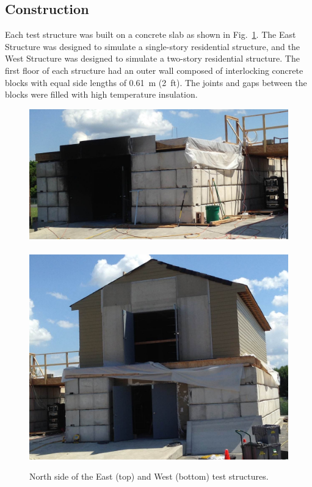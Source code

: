 \documentclass[12pt,oneside]{book}
\begin{document}
\subsection{Construction}
\label{sec:construction}
Each test structure was built on a concrete slab as shown in Fig.~\ref{fig:struct_pics}. The East Structure was designed to simulate a single-story residential structure, and the West Structure was designed to simulate a two-story residential structure. The first floor of each structure had an outer wall composed of interlocking concrete blocks with equal side lengths of 0.61~m (2~ft). The joints and gaps between the blocks were filled with high temperature insulation.

\begin{figure}[!ht]
	\includegraphics[width=5.25in]{../../Hose_Stream_Tests/Figures/Pictures/east_structure}
	\\~\\
	\includegraphics[width=5.25in]{../../Hose_Stream_Tests/Figures/Pictures/west_structure}
	\caption[North side of the East and West Structures.]{North side of the East (top) and West (bottom) test structures.}
	\label{fig:struct_pics}
\end{figure}
\end{document}
